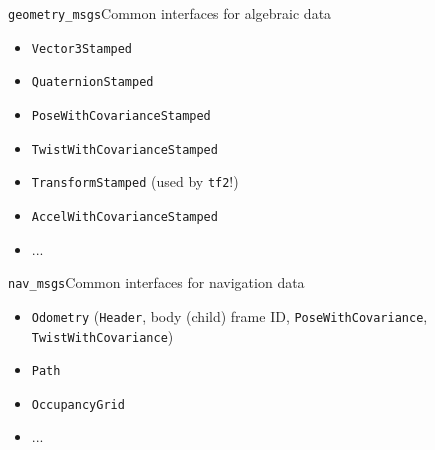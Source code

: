 \begin{frame}{\texttt{geometry\_msgs}}{Common interfaces for algebraic data}
  \begin{itemize}
    \item \texttt{Vector3Stamped}
    \item \texttt{QuaternionStamped}
    \item \texttt{PoseWithCovarianceStamped}
    \item \texttt{TwistWithCovarianceStamped}
    \item \texttt{TransformStamped} (used by \texttt{tf2}!)
    \item \texttt{AccelWithCovarianceStamped}
    \item ...
  \end{itemize}
\end{frame}

\begin{frame}{\texttt{nav\_msgs}}{Common interfaces for navigation data}
  \begin{itemize}
    \item \texttt{Odometry} (\texttt{Header}, body (child) frame ID, \texttt{PoseWithCovariance}, \texttt{TwistWithCovariance})
    \item \texttt{Path}
    \item \texttt{OccupancyGrid}
    \item ...
  \end{itemize}
\end{frame}
